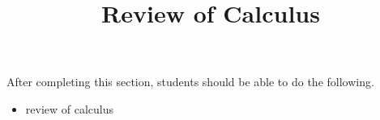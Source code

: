 \documentclass{ximera}
\title{Review of Calculus}
\begin{document}
\begin{abstract}
\end{abstract}

\maketitle

\begin{sectionOutcomes}

After completing this section, students should be able to do the following.

\begin{itemize}
\item review of calculus
\end{itemize}

\end{sectionOutcomes}
\end{document}
